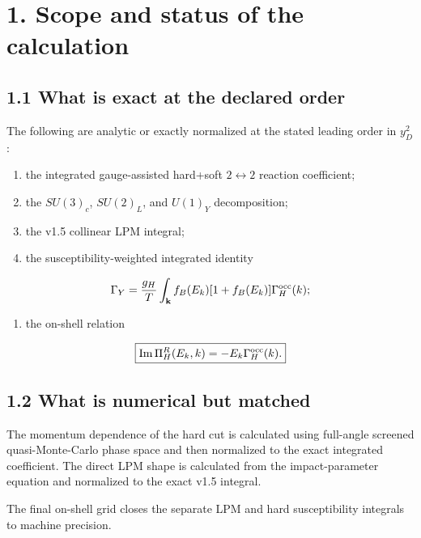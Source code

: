 \documentclass[
  10pt,
]{article}
\providecommand{\tightlist}{%
  \setlength{\itemsep}{0pt}\setlength{\parskip}{0pt}}
\begin{document}
\section{1. Scope and status of the
calculation}\label{scope-and-status-of-the-calculation}

\subsection{1.1 What is exact at the declared
order}\label{what-is-exact-at-the-declared-order}

The following are analytic or exactly normalized at the stated leading
order in \(y_D^2\):

\begin{enumerate}
\def\labelenumi{\arabic{enumi}.}
\tightlist
\item
  the integrated gauge-assisted hard+soft \(2\leftrightarrow2\) reaction
  coefficient;
\item
  the \(SU(3)_c\), \(SU(2)_L\), and \(U(1)_Y\) decomposition;
\item
  the v1.5 collinear LPM integral;
\item
  the susceptibility-weighted integrated identity
\end{enumerate}

\[
\Gamma_Y
=
\frac{g_H}{T}
\int_{\mathbf k}
 f_B(E_k)[1+f_B(E_k)]
\Gamma_H^{\rm occ}(k);
\]

\begin{enumerate}
\def\labelenumi{\arabic{enumi}.}
\setcounter{enumi}{4}
\tightlist
\item
  the on-shell relation
\end{enumerate}

\[
\boxed{
\operatorname{Im}\Pi_H^R(E_k,k)
=-E_k\Gamma_H^{\rm occ}(k).
}
\]

\subsection{1.2 What is numerical but
matched}\label{what-is-numerical-but-matched}

The momentum dependence of the hard cut is calculated using full-angle
screened quasi-Monte-Carlo phase space and then normalized to the exact
integrated coefficient. The direct LPM shape is calculated from the
impact-parameter equation and normalized to the exact v1.5 integral.

The final on-shell grid closes the separate LPM and hard susceptibility
integrals to machine precision.
\end{document}
